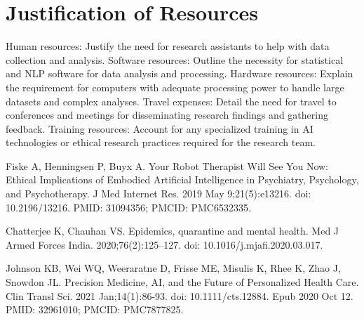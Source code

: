 \documentclass[12pt]{article}
\begin{document}
    \section{Justification of Resources}
    Human resources: Justify the need for research assistants to help with data collection and analysis.
    Software resources: Outline the necessity for statistical and NLP software for data analysis and processing.
    Hardware resources: Explain the requirement for computers with adequate processing power to handle large datasets and complex analyses.
    Travel expenses: Detail the need for travel to conferences and meetings for disseminating research findings and gathering feedback.
    Training resources: Account for any specialized training in AI technologies or ethical research practices required for the research team.

    \newpage
    
    
    Fiske A, Henningsen P, Buyx A. Your Robot Therapist Will See You Now: Ethical Implications of Embodied Artificial Intelligence in Psychiatry, Psychology, and Psychotherapy. J Med Internet Res. 2019 May 9;21(5):e13216. doi: 10.2196/13216. PMID: 31094356; PMCID: PMC6532335.

    Chatterjee K, Chauhan VS. Epidemics, quarantine and mental health. Med J Armed Forces India. 2020;76(2):125–127. doi: 10.1016/j.mjafi.2020.03.017.

    Johnson KB, Wei WQ, Weeraratne D, Frisse ME, Misulis K, Rhee K, Zhao J, Snowdon JL. Precision Medicine, AI, and the Future of Personalized Health Care. Clin Transl Sci. 2021 Jan;14(1):86-93. doi: 10.1111/cts.12884. Epub 2020 Oct 12. PMID: 32961010; PMCID: PMC7877825.
\end{document}
